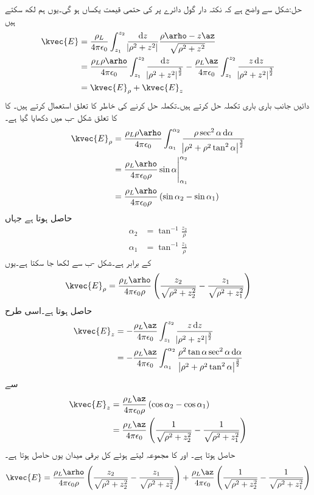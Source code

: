 حل:شکل  سے واضح ہے کہ نکتہ دار گول دائرے پر  کی حتمی قیمت  یکساں ہو گی۔یوں ہم لکھ سکتے ہیں
\begin{align*}
\kvec{E}&=\frac{\rho_L}{4\pi\epsilon_0} \int_{z_1}^{z_2} \frac{\dif z}{\abs{\rho^2+z^2}} \frac{\rho\arho-z\az}{\sqrt{\rho^2+z^2}}\\
&=\frac{\rho_L \rho\arho}{4\pi\epsilon_0} \int_{z_1}^{z_2} \frac{\dif z}{\abs{\rho^2+z^2}^{\frac{3}{2}}}-\frac{\rho_L \az}{4\pi\epsilon_0} \int_{z_1}^{z_2} \frac{z\dif z}{\abs{\rho^2+z^2}^{\frac{3}{2}}}\\
&=\kvec{E}_\rho +\kvec{E}_z
\end{align*}
دائیں جانب باری باری تکملہ حل کرتے ہیں۔تکملہ حل کرنے کی خاطر  کا تعلق استعمال کرتے ہیں۔ کا  کا تعلق شکل -ب میں دکھایا گیا ہے۔
\begin{align*}
\kvec{E}_\rho&=\frac{\rho_L \rho\arho}{4\pi\epsilon_0} \int_{\alpha_1}^{\alpha_2} \frac{\rho \sec^2 \alpha\dif \alpha}{\abs{\rho^2+\rho^2 \tan^2 \alpha}^{\frac{3}{2}}}\\
&=\frac{\rho_L \arho}{4\pi\epsilon_0 \rho} \eval{\sin \alpha}_{\alpha_1}^{\alpha_2}\\
&=\frac{\rho_L \arho}{4\pi\epsilon_0 \rho} \left(\sin \alpha_2-\sin \alpha_1 \right)
\end{align*}
حاصل ہوتا ہے جہاں
\begin{align*}
\alpha_2&=\tan^{-1} \frac{z_2}{\rho}\\
\alpha_1&=\tan^{-1} \frac{z_1}{\rho}
\end{align*}
کے برابر ہے۔شکل  -ب سے  لکھا جا سکتا ہے۔یوں
\begin{align*}
\kvec{E}_{\rho}=\frac{\rho_L \arho}{4\pi\epsilon_0 \rho} \left(\frac{z_2}{\sqrt{\rho^2+z_2^2}}-\frac{z_1}{\sqrt{\rho^2+z_1^2}}\right)
\end{align*}
حاصل ہوتا ہے۔اسی طرح
\begin{align*}
\kvec{E}_z&=-\frac{\rho_L \az}{4\pi\epsilon_0} \int_{z_1}^{z_2} \frac{z\dif z}{\abs{\rho^2+z^2}^{\frac{3}{2}}}\\
&=-\frac{\rho_L \az}{4\pi\epsilon_0} \int_{\alpha_1}^{\alpha_2} \frac{\rho^2 \tan \alpha \sec^2 \alpha \dif \alpha}{\abs{\rho^2+\rho^2 \tan^2 \alpha}^{\frac{3}{2}}}
\end{align*}
سے
\begin{align*}
\kvec{E}_z&=\frac{\rho_L \az}{4\pi\epsilon_0 \rho} \left(\cos \alpha_2 -\cos \alpha_1 \right)\\
&=\frac{\rho_L \az}{4\pi\epsilon_0 } \left(\frac{1}{\sqrt{\rho^2+z_2^2}}-\frac{1}{\sqrt{\rho^2+z_1^2}} \right)
\end{align*}
حاصل ہوتا ہے۔ اور  کا مجموعہ لیتے ہوئے کل برقی میدان یوں حاصل ہوتا ہے۔
\begin{align}
\kvec{E}=\frac{\rho_L \arho}{4\pi\epsilon_0 \rho} \left(\frac{z_2}{\sqrt{\rho^2+z_2^2}}-\frac{z_1}{\sqrt{\rho^2+z_1^2}}\right)+\frac{\rho_L \az}{4\pi\epsilon_0 } \left(\frac{1}{\sqrt{\rho^2+z_2^2}}-\frac{1}{\sqrt{\rho^2+z_1^2}} \right)
\end{align}

